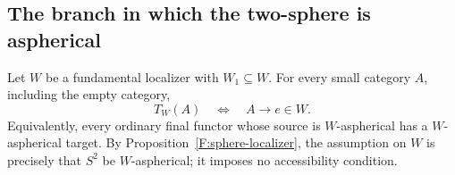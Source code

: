 \subsection{The branch in which the two-sphere is aspherical}

\begin{proposition}
\label{D:sphere-totality}
Let $W$ be a fundamental localizer with $W_1\subseteq W$.
For every small category $A$, including the empty category,
\[
 T_W(A)\quad\Longleftrightarrow\quad A\to e\in W.
\]
Equivalently, every ordinary final functor whose source is
$W$-aspherical has a $W$-aspherical target. By
Proposition~\ref{F:sphere-localizer}, the assumption on $W$
is precisely that $S^2$ be $W$-aspherical; it imposes no
accessibility condition.
\end{proposition}

